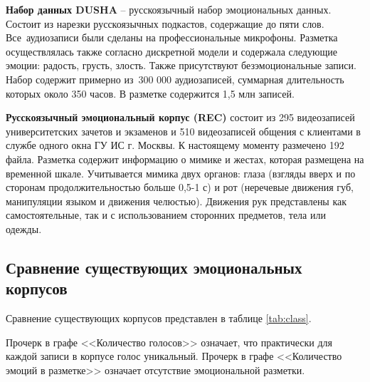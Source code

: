 \textbf{Набор данных DUSHA} \cite{dusha} -- русскоязычный набор эмоциональных данных. Состоит из нарезки русскоязычных подкастов, содержащие до пяти слов. Все аудиозаписи были сделаны на профессиональные микрофоны. Разметка осуществлялась также согласно дискретной модели и содержала следующие эмоции: радость, грусть, злость. Также присутствуют безэмоциональные записи. Набор содержит примерно из 300 000 аудиозаписей, суммарная длительность которых около 350 часов. В разметке содержится 1,5 млн записей. 

\textbf{Русскоязычный эмоциональный корпус (REC)} \cite{rec} состоит из 295 видеозаписей университетских зачетов и экзаменов и 510 видеозаписей общения с клиентами в службе одного окна ГУ ИС г. Москвы. К настоящему моменту размечено 192 файла. Разметка содержит информацию о мимике и жестах, которая размещена на временной шкале. Учитывается мимика двух органов: глаза (взгляды вверх и по сторонам продолжительностью больше 0,5-1 с) и рот (неречевые движения губ, манипуляции языком и движения челюстью). Движения рук представлены как самостоятельные, так и с использованием сторонних предметов, тела или одежды.

\subsection{Сравнение существующих эмоциональных корпусов}
Сравнение существующих корпусов представлен в таблице \ref{tab:class}. 
\begin{table}[H]
	\centering
	\caption{Сравнение существующих эмоциональных корпусов}\label{tab:class}
\end{table}
Прочерк в графе <<Количество голосов>> означает, что практически для каждой записи в корпусе голос уникальный. Прочерк в графе <<Количество эмоций в разметке>> означает отсутствие эмоциональной разметки.

